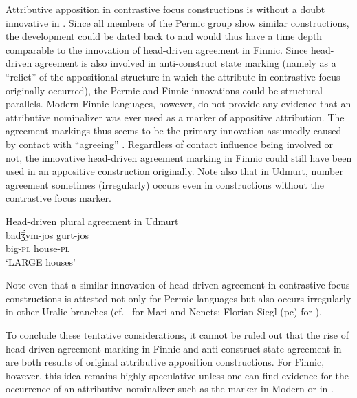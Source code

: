{
Attributive apposition in contrastive focus constructions is without a doubt innovative in . Since all members of the Permic group show similar constructions, the development could be dated back to  and would thus have a time depth comparable to the innovation of head\hyp{}driven agreement in Finnic. Since head\hyp{}driven agreement is also involved in  anti\hyp{}construct state marking (namely as a “relict” of the appositional structure in which the attribute in contrastive focus originally occurred), the Permic and Finnic innovations could be structural parallels. Modern Finnic languages, however, do not provide any evidence that an attributive nominalizer was ever used as a marker of appositive attribution. The agreement markings thus seems to be the primary innovation assumedly caused by contact with “agreeing” . Regardless of contact influence being involved or not, the innovative head\hyp{}driven agreement marking in Finnic could still have been used in an appositive construction originally. Note also that in Udmurt, number agreement sometimes (irregularly) occurs even in constructions without the contrastive focus marker.
\begin{exe}
\ex \rm{Head\hyp{}driven plural agreement in Udmurt \citep{winkler2001}}\\
\gll	badǯ́ym-jos gurt-jos\\
	big-\textsc{pl} house-\textsc{pl}\\
\glt	‘LARGE houses’
\end{exe}
Note even that a similar innovation of head\hyp{}driven agreement in contrastive focus constructions is attested not only for Permic languages but also occurs irregularly in other Uralic branches (cf.~\citealt[136–138, 142]{honti1997} for Mari and Nenets; Florian Siegl (pc) for ).%

To conclude these tentative considerations, it cannot be ruled out that the rise of head\hyp{}driven agreement marking in Finnic and anti\hyp{}construct state agreement in  are both results of original attributive apposition constructions. For Finnic, however, this idea remains highly speculative unless one can find evidence for the occurrence of an attributive nominalizer such as the marker in Modern  or in .

}
